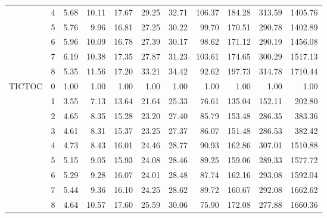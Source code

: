 \begin{tabular}{llrrrrrrrrr}
       & 4 &  5.68 & 10.11 & 17.67 & 29.25 & 32.71 & 106.37 & 184.28 & 313.59 & 1405.76 \\
       & 5 &  5.76 &  9.96 & 16.81 & 27.25 & 30.22 &  99.70 & 170.51 & 290.78 & 1402.89 \\
       & 6 &  5.96 & 10.09 & 16.78 & 27.39 & 30.17 &  98.62 & 171.12 & 290.19 & 1456.08 \\
       & 7 &  6.19 & 10.38 & 17.35 & 27.87 & 31.23 & 103.61 & 174.65 & 300.29 & 1517.13 \\
       & 8 &  5.35 & 11.56 & 17.20 & 33.21 & 34.42 &  92.62 & 197.73 & 314.78 & 1710.44 \\
TICTOC & 0 &  1.00 &  1.00 &  1.00 &  1.00 &  1.00 &   1.00 &   1.00 &   1.00 &    1.00 \\
       & 1 &  3.55 &  7.13 & 13.64 & 21.64 & 25.33 &  76.61 & 135.04 & 152.11 &  202.80 \\
       & 2 &  4.65 &  8.35 & 15.28 & 23.20 & 27.40 &  85.79 & 153.48 & 286.35 &  383.36 \\
       & 3 &  4.61 &  8.31 & 15.37 & 23.25 & 27.37 &  86.07 & 151.48 & 286.53 &  382.42 \\
       & 4 &  4.73 &  8.43 & 16.01 & 24.46 & 28.77 &  90.93 & 162.86 & 307.01 & 1510.88 \\
       & 5 &  5.15 &  9.05 & 15.93 & 24.08 & 28.46 &  89.25 & 159.06 & 289.33 & 1577.72 \\
       & 6 &  5.29 &  9.28 & 16.07 & 24.01 & 28.48 &  87.74 & 162.16 & 293.08 & 1592.04 \\
       & 7 &  5.44 &  9.36 & 16.10 & 24.25 & 28.62 &  89.72 & 160.67 & 292.08 & 1662.62 \\
       & 8 &  4.64 & 10.57 & 17.60 & 25.59 & 30.06 &  75.90 & 172.08 & 277.88 & 1660.36 \\
\bottomrule
\end{tabular}
